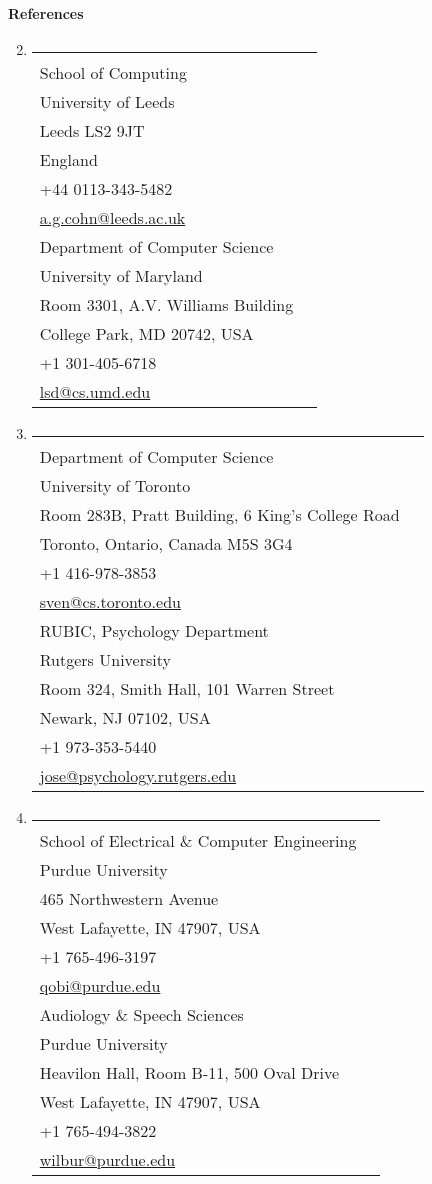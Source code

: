 \documentclass[10pt]{article}
\makeatletter
\newenvironment{benumerate}[2]{
    \let\oldItem\item
    \def\item{\addtocounter{enumi}{-2}\oldItem}
    \begin{enumerate}[#2]
    \setcounter{enumi}{#1}
    \addtocounter{enumi}{1}}
  {\end{enumerate}}
\newcommand{\reference}[7]{%
  \begin{tabular}{@{}l@{}}%
    \textbf{#1}\\%
    #2\\%
    #3\\%
    #4\\%
    #5\\%
    #6\\%
    \href{mailto:#7}{#7}%
  \end{tabular}%
}
\newcommand{\refrow}[2]{%
\item \begin{tabular*}{0.9\textwidth}{@{}p{3.0in}@{\hspace*{0.3in}}p{3.0in}@{}} #1 & #2 \end{tabular*}
\vspace*{1ex}}
\newenvironment{region}[3]{%
  \vspace*{0.5ex}
  {\large \textbf{#1}}
  \begin{benumerate}{#3}{\color{RoyalBlue}#2}}
  {\end{benumerate}\vspace*{1ex}}
\newenvironment{nonumregion}[1]{%
\begin{region}{#1}{}{1}}
{\end{region}\vspace*{1ex}}
\makeatother
\begin{document}
\begin{nonumregion}{References}
  \refrow{
    \reference{Tony Cohn}
    {School of Computing}
    {University of Leeds}
    {Leeds LS2 9JT}
    {England}
    {+44 0113-343-5482}
    {a.g.cohn@leeds.ac.uk}
  }{
    \reference{Larry Davis}
    {Department of Computer Science}
    {University of Maryland}
    {Room 3301, A.V. Williams Building}
    {College Park, MD 20742, USA}
    {+1 301-405-6718}
    {lsd@cs.umd.edu}
  }
  \refrow{
    \reference{Sven Dickinson}
    {Department of Computer Science}
    {University of Toronto}
    {Room 283B, Pratt Building, 6 King's College Road}
    {Toronto, Ontario, Canada M5S 3G4}
    {+1 416-978-3853}
    {sven@cs.toronto.edu}
  }{
    \reference{Stephen Jos\'e Hanson}
    {RUBIC, Psychology Department}
    {Rutgers University}
    {Room 324, Smith Hall, 101 Warren Street}
    {Newark, NJ 07102, USA}
    {+1 973-353-5440}
    {jose@psychology.rutgers.edu}
  }
  \refrow{
    \reference{Jeffrey Mark Siskind}
    {School of Electrical \& Computer Engineering}
    {Purdue University}
    {465 Northwestern Avenue}
    {West Lafayette, IN 47907, USA}
    {+1 765-496-3197}
    {qobi@purdue.edu}
  }{
    \reference{Ronnie Wilbur}
    {Audiology \& Speech Sciences}
    {Purdue University}
    {Heavilon Hall, Room B-11, 500 Oval Drive}
    {West Lafayette, IN 47907, USA}
    {+1 765-494-3822}
    {wilbur@purdue.edu}
  }
\end{nonumregion}
\end{document}
